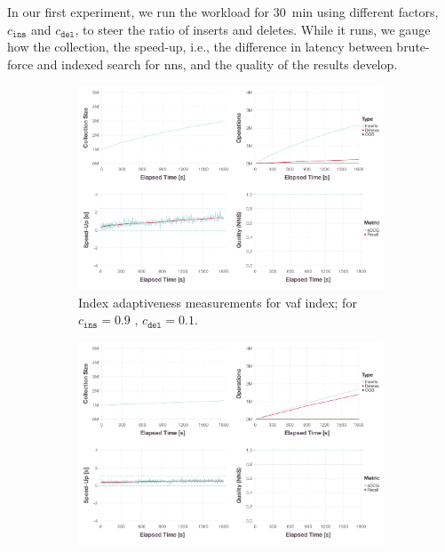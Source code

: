 In our first experiment, we run the workload for \SI{30}{\minute} using different factors, $c_{\texttt{ins}}$ and $c_{\texttt{del}}$, to steer the ratio of inserts and deletes. While it runs, we gauge how the collection, the speed-up, i.e., the difference in latency between brute-force and indexed search for \acrshort{nns}, and the quality of the results develop.

\begin{figure}[p]
    \centering
    \begin{subfigure}[b]{\textwidth}
        \centering
        \includegraphics[width=\textwidth]{figures/index/index-vaf-adaptiveness-90-10-no-rebuild}
        \caption{Index adaptiveness measurements for \acrshort{vaf} index; for $c_{\texttt{ins}} = 0.9$ , $c_{\texttt{del}} = 0.1$.}
        \label{figure:index_adaptiveness_vaf_90_10}
    \end{subfigure}
    \hfill
    \centering
    \begin{subfigure}[b]{\textwidth}
        \centering
        \includegraphics[width=\textwidth]{figures/index/index-vaf-adaptiveness-50-50-no-rebuild}

\end{subfigure}
\end{figure}
